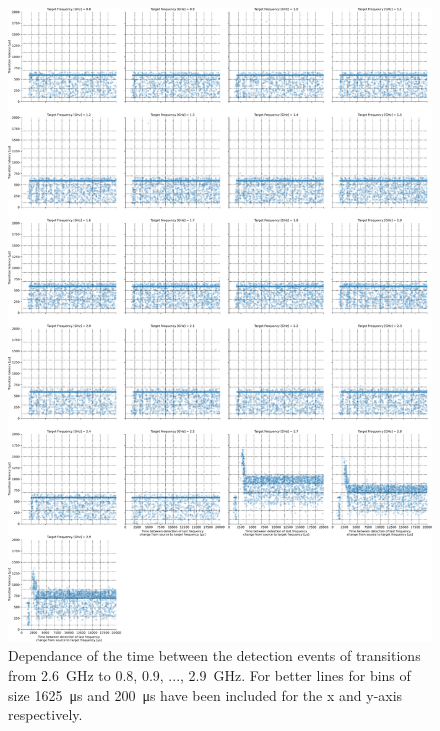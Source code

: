 \begin{figure}[]
    \centering
    \includegraphics[width=\columnwidth]{fig/ftalat_scatter_wait_transition_latency_hati_source_2.6.pdf}
    \caption{Dependance of the time between the detection events of transitions from \SI{2.6}{\GHz} to \SI{0.8}{}, \SI{0.9}{}, ..., \SI{2.9}{\GHz}. For better lines for bins of size \SI{1625}{\us} and \SI{200}{\us} have been included for the x and y-axis respectively.}
\end{figure}
